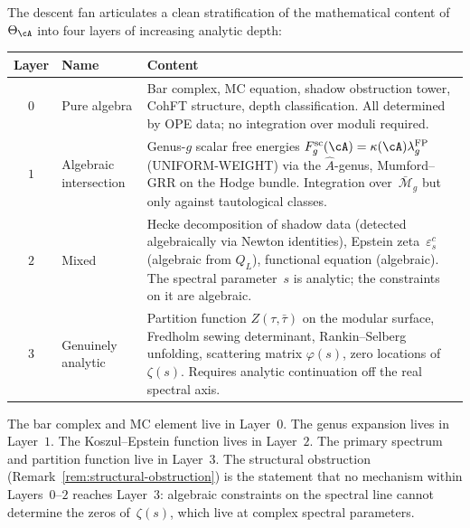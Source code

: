 \begin{remark}%
\label{rem:four-layer-stratification}%
%
%
The descent fan articulates a clean stratification of the
mathematical content of~$\Theta_\cA$ into four layers of
increasing analytic depth:
\begin{center}
\renewcommand{\arraystretch}{1.3}
\begin{tabular}{@{}clp{7.5cm}@{}}
\toprule
\textbf{Layer} & \textbf{Name} & \textbf{Content} \\
\midrule
$0$ & Pure algebra & Bar complex, MC equation, shadow obstruction tower,
 CohFT structure, depth classification.
 All determined by OPE data; no integration over
 moduli required. \\[2pt]
$1$ & Algebraic intersection & Genus-$g$ scalar free energies
 $F_g^{\mathrm{sc}}(\cA)=\kappa(\cA)\lambda_g^{\mathrm{FP}}$
 \textup{(}UNIFORM-WEIGHT\textup{}) via the
 $\hat{A}$-genus, Mumford--GRR on the Hodge bundle.
 Integration over~$\bar{\mathcal{M}}_g$ but only
 against tautological classes. \\[2pt]
$2$ & Mixed & Hecke decomposition of shadow data
 (detected algebraically via Newton identities),
 Epstein zeta~$\varepsilon^c_s$ (algebraic from $Q_L$),
 functional equation (algebraic). The spectral
 parameter~$s$ is analytic; the constraints on it
 are algebraic. \\[2pt]
$3$ & Genuinely analytic & Partition function
 $Z(\tau, \bar\tau)$ on the modular surface,
 Fredholm sewing determinant, Rankin--Selberg unfolding,
 scattering matrix $\varphi(s)$, zero locations
 of~$\zeta(s)$. Requires analytic continuation
 off the real spectral axis. \\
\bottomrule
\end{tabular}
\end{center}
The bar complex and MC element live in Layer~$0$.
The genus expansion lives in Layer~$1$.
The Koszul--Epstein function lives in Layer~$2$.
The primary spectrum and partition function live in
Layer~$3$. The structural obstruction
(Remark~\ref{rem:structural-obstruction}) is the
statement that no mechanism within Layers~$0$--$2$
reaches Layer~$3$: algebraic constraints on the
spectral line cannot determine the zeros of~$\zeta(s)$,
which live at complex spectral parameters.
\end{remark}

